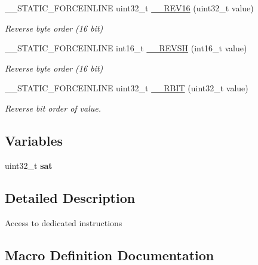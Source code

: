 \begin{DoxyCompactItemize}
\+\_\+\+\_\+\+S\+T\+A\+T\+I\+C\+\_\+\+F\+O\+R\+C\+E\+I\+N\+L\+I\+NE uint32\+\_\+t \mbox{\hyperlink{group___c_m_s_i_s___core___instruction_interface_gaa12aedd096506c9639c1581acd5c6a78}{\+\_\+\+\_\+\+R\+E\+V16}} (uint32\+\_\+t value)
\begin{DoxyCompactList}\small\item\em Reverse byte order (16 bit) \end{DoxyCompactList}\item 
\+\_\+\+\_\+\+S\+T\+A\+T\+I\+C\+\_\+\+F\+O\+R\+C\+E\+I\+N\+L\+I\+NE int16\+\_\+t \mbox{\hyperlink{group___c_m_s_i_s___core___instruction_interface_gacb695341318226a5f69ed508166622ac}{\+\_\+\+\_\+\+R\+E\+V\+SH}} (int16\+\_\+t value)
\begin{DoxyCompactList}\small\item\em Reverse byte order (16 bit) \end{DoxyCompactList}\item 
\+\_\+\+\_\+\+S\+T\+A\+T\+I\+C\+\_\+\+F\+O\+R\+C\+E\+I\+N\+L\+I\+NE uint32\+\_\+t \mbox{\hyperlink{group___c_m_s_i_s___core___instruction_interface_gaf944a7b7d8fd70164cca27669316bcf7}{\+\_\+\+\_\+\+R\+B\+IT}} (uint32\+\_\+t value)
\begin{DoxyCompactList}\small\item\em Reverse bit order of value. \end{DoxyCompactList}\end{DoxyCompactItemize}
\subsection*{Variables}
\begin{DoxyCompactItemize}
\item 
uint32\+\_\+t {\bfseries sat}
\end{DoxyCompactItemize}


\subsection{Detailed Description}
Access to dedicated instructions 

\subsection{Macro Definition Documentation}
\mbox{\label{group___c_m_s_i_s___core___instruction_interface_ga15ea6bd3c507d3e81c3b3a1258e46397}} 
